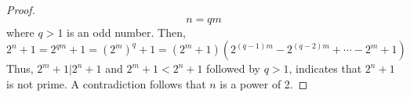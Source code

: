 \documentclass[a4paper,12pt]{article}
\theoremstyle{definition}
\newenvironment{problems}{\begin{list}{}{\renewcommand{\makelabel}[1]{\textbf{##1}\hfil}}}{\end{list}}
\begin{document}
\begin{problems}
\begin{proof}
        \begin{equation*}
            n=qm
        \end{equation*}
        where $q>1$ is an odd number. Then,
        \begin{equation*}
            2^n + 1 = 2^{qm} + 1 = (2^m)^q + 1 = (2^m+1)\left(2^{(q-1)m}-2^{(q-2)m}+\cdots-2^m+1\right)
        \end{equation*}
        Thus, $2^m+1 | 2^n + 1$ and $2^m+1<2^n+1$ followed by $q>1$, indicates that $2^n+1$ is not prime. A contradiction follows that $n$ is a power of 2.
    \end{proof}
\end{problems}
\end{document}
